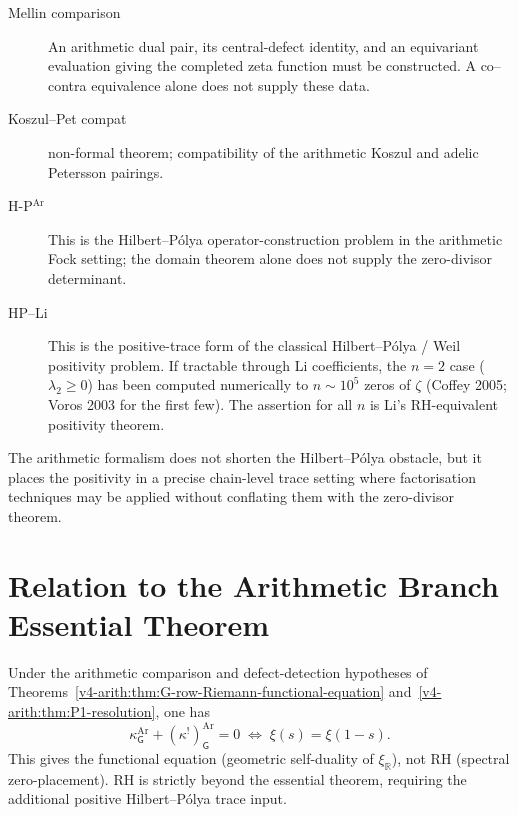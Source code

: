 \begin{remark}
\label{v4-arith:rh:rem:sufficient-path-paper}
\begin{description}
\item[Mellin comparison] An arithmetic dual pair, its central-defect
identity, and an equivariant evaluation giving the completed zeta
function must be constructed. A co--contra equivalence alone does
not supply these data.
\item[Koszul--Pet compat] non-formal theorem; compatibility of the
arithmetic Koszul and adelic Petersson pairings.
\item[H-P\(^{\mathrm{Ar}}\)] This is the Hilbert--P\'olya
operator-construction problem in the arithmetic Fock setting; the
domain theorem alone does not supply the zero-divisor determinant.
\item[HP--Li] This is the positive-trace form of the
classical Hilbert--P\'olya / Weil positivity problem. If
tractable through Li coefficients, the
\(n=2\) case (\(\lambda_{2}\geq 0\)) has been
computed numerically to \(n\sim 10^{5}\) zeros of \(\zeta\) (Coffey
2005; Voros 2003 for the first few). The assertion for all \(n\) is
Li's RH-equivalent positivity theorem.
\end{description}
The arithmetic formalism does not shorten the Hilbert--P\'olya
obstacle, but it places the positivity in a precise chain-level trace
setting where factorisation techniques may be applied without
conflating them with the zero-divisor theorem.
\end{remark}

\section{Relation to the Arithmetic Branch Essential Theorem}
\label{v4-arith:rh:load-bearing-relation}

Under the arithmetic comparison and defect-detection hypotheses of
Theorems~\ref{v4-arith:thm:G-row-Riemann-functional-equation}
and~\ref{v4-arith:thm:P1-resolution}, one has
\begin{equation}
\kappa^{\mathrm{Ar}}_{\mathsf{G}}+(\kappa^{!})^{\mathrm{Ar}}_{\mathsf{G}}=0\;\Longleftrightarrow\;\xi(s)=\xi(1-s).
\end{equation}
This gives the functional equation (geometric self-duality of
\(\xi_{\mathbb R}\)), not RH (spectral zero-placement). RH is
strictly beyond the essential theorem, requiring the additional
positive Hilbert--P\'olya trace input.

